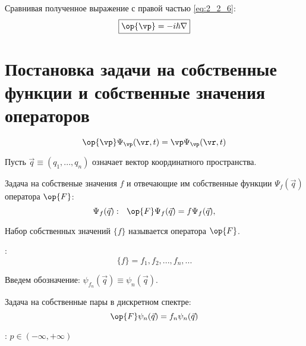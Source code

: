 Сравнивая полученное выражение с правой частью \eqref{eq:2_2_6}:
\begin{equation}
\label{eq:2_2_7}
\boxed{ \op{\vp} = -i\hbar\nabla }
\end{equation}

\section{Постановка задачи на собственные функции и собственные значения операторов}

\begin{equation}
\label{eq:2_3_1}
\op{\vp} \Psi_\vp(\vr,t) = \vp \Psi_\vp(\vr,t)
\end{equation}

Пусть $\vec{q}\equiv(q_1,...,q_n)$ означает вектор координатного пространства.

Задача на собственые значения $f$ и отвечающие им собственные функции $\Psi_f(\vec{q})$ оператора $\op{F}$: 
\begin{equation}
\label{eq:2_3_2}
\Psi_f(\vec{q}):~~ \op{F}\Psi_f(\vec{q}) = f \Psi_f(\vec{q}), 
\end{equation}

\begin{defn}
Набор собственных значений $\{f\}$ называется  оператора $\op{F}$.
\end{defn}

:
$$\{f\} = f_1,f_2,...,f_n,... $$

Введем обозначение: $\psi_{f_n}(\vec{q}) \equiv \psi_n(\vec{q})$.

Задача на собственные пары в дискретном спектре:
\begin{equation}
\label{eq:2_3_3}
\op{F} \psi_n(\vec{q}) = f_n \psi_n(\vec{q})
\end{equation}

: $p \in (-\infty, +\infty)$